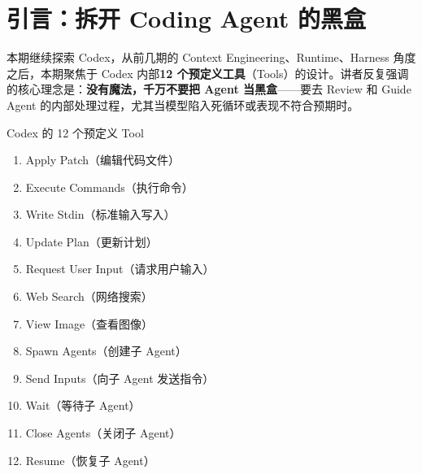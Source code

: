 \section{引言：拆开 Coding Agent 的黑盒}

本期继续探索 Codex，从前几期的 Context Engineering、Runtime、Harness 角度之后，本期聚焦于 Codex 内部\textbf{12 个预定义工具}（Tools）的设计。讲者反复强调的核心理念是：\textbf{没有魔法，千万不要把 Agent 当黑盒}——要去 Review 和 Guide Agent 的内部处理过程，尤其当模型陷入死循环或表现不符合预期时。

\begin{knowledgebox}{Codex 的 12 个预定义 Tool}
\begin{enumerate}
    \item Apply Patch（编辑代码文件）
    \item Execute Commands（执行命令）
    \item Write Stdin（标准输入写入）
    \item Update Plan（更新计划）
    \item Request User Input（请求用户输入）
    \item Web Search（网络搜索）
    \item View Image（查看图像）
    \item Spawn Agents（创建子 Agent）
    \item Send Inputs（向子 Agent 发送指令）
    \item Wait（等待子 Agent）
    \item Close Agents（关闭子 Agent）
    \item Resume（恢复子 Agent）
\end{enumerate}
\end{knowledgebox}



